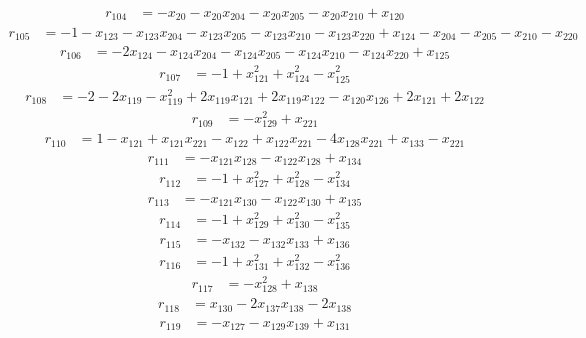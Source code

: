 \begin{align*}
r_{104}&=
-x_{20}-x_{20}x_{204}-x_{20}x_{205}-x_{20}x_{210}+x_{120}
\end{align*}
\begin{align*}
r_{105}&=
-1-x_{123}-x_{123}x_{204}-x_{123}x_{205}-x_{123}x_{210}-x_{123}x_{220}+x_{124}-x_{204}-x_{205}-x_{210}-x_{220}
\end{align*}
\begin{align*}
r_{106}&=
-2x_{124}-x_{124}x_{204}-x_{124}x_{205}-x_{124}x_{210}-x_{124}x_{220}+x_{125}
\end{align*}
\begin{align*}
r_{107}&=
-1+x_{121}^{2}+x_{124}^{2}-x_{125}^{2}
\end{align*}
\begin{align*}
r_{108}&=
-2-2x_{119}-x_{119}^{2}+2x_{119}x_{121}+2x_{119}x_{122}-x_{120}x_{126}+2x_{121}+2x_{122}
\end{align*}
\begin{align*}
r_{109}&=
-x_{129}^{2}+x_{221}
\end{align*}
\begin{align*}
r_{110}&=
1-x_{121}+x_{121}x_{221}-x_{122}+x_{122}x_{221}-4x_{128}x_{221}+x_{133}-x_{221}
\end{align*}
\begin{align*}
r_{111}&=
-x_{121}x_{128}-x_{122}x_{128}+x_{134}
\end{align*}
\begin{align*}
r_{112}&=
-1+x_{127}^{2}+x_{128}^{2}-x_{134}^{2}
\end{align*}
\begin{align*}
r_{113}&=
-x_{121}x_{130}-x_{122}x_{130}+x_{135}
\end{align*}
\begin{align*}
r_{114}&=
-1+x_{129}^{2}+x_{130}^{2}-x_{135}^{2}
\end{align*}
\begin{align*}
r_{115}&=
-x_{132}-x_{132}x_{133}+x_{136}
\end{align*}
\begin{align*}
r_{116}&=
-1+x_{131}^{2}+x_{132}^{2}-x_{136}^{2}
\end{align*}
\begin{align*}
r_{117}&=
-x_{128}^{2}+x_{138}
\end{align*}
\begin{align*}
r_{118}&=
x_{130}-2x_{137}x_{138}-2x_{138}
\end{align*}
\begin{align*}
r_{119}&=
-x_{127}-x_{129}x_{139}+x_{131}
\end{align*}
